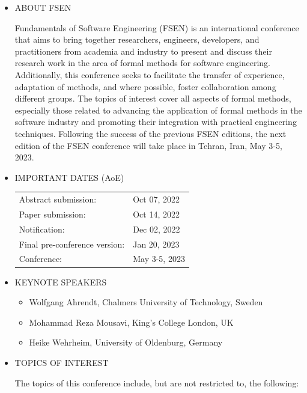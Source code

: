 \documentclass[prodmode,acmtecs]{acmsmall} %
\begin{document}
\begin{itemize}\item  ABOUT FSEN  
 
  Fundamentals of Software Engineering (FSEN) is an international conference that aims to bring together researchers, engineers, developers, and practitioners from academia and industry to present and discuss their research work in the area of formal methods for software engineering. Additionally, this conference seeks to facilitate the transfer of experience, adaptation of methods, and where possible, foster collaboration among different groups. The topics of interest cover all aspects of formal methods, especially those related to advancing the application of formal methods in the software industry and promoting their integration with practical engineering techniques. Following the success of the previous FSEN editions, the next edition of the FSEN conference will take place in Tehran, Iran, May 3-5, 2023. 
 
\item  IMPORTANT DATES (AoE) 
 
\begin{tabulary}{\linewidth}{LL}Abstract submission:  & Oct 07, 2022 \\
Paper submission:  & Oct 14, 2022 \\
Notification:  & Dec 02, 2022 \\
Final pre-conference version:  & Jan 20, 2023 \\
Conference:  & May 3-5, 2023 \\
\end{tabulary}
 
\item  KEYNOTE SPEAKERS  
 
\begin{itemize}\item  Wolfgang Ahrendt, Chalmers University of Technology, Sweden
\item  Mohammad Reza Mousavi, King's College London, UK
\item  Heike Wehrheim, University of Oldenburg, Germany
\end{itemize} 
\item  TOPICS OF INTEREST  
 
  The topics of this conference include, but are not restricted to, the following: 
 

\end{itemize}
\end{document}
